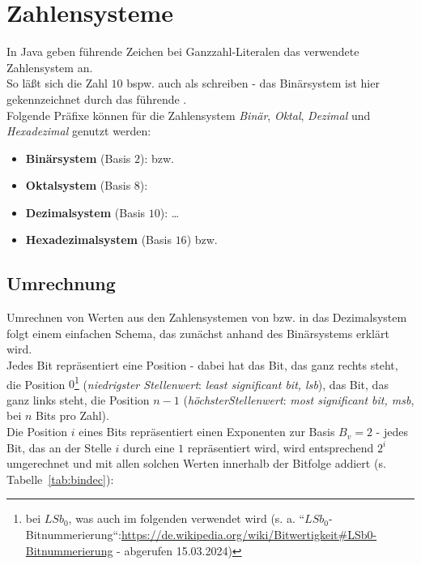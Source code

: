 
\section{Zahlensysteme}

In Java geben führende Zeichen bei Ganzzahl-Literalen das verwendete Zahlensystem an.\\

\noindent
So läßt sich die Zahl $10$ bspw. auch als  schreiben - das Binärsystem ist hier gekennzeichnet durch das führende .\\

\noindent
Folgende Präfixe können für die Zahlensystem \textit{Binär}, \textit{Oktal}, \textit{Dezimal} und \textit{Hexadezimal} genutzt werden:

\begin{itemize}
    \item \textbf{Binärsystem} (Basis $2$):  bzw. 
    \item \textbf{Oktalsystem} (Basis $8$): 
    \item \textbf{Dezimalsystem} (Basis $10$):  \ldots {}
    \item \textbf{Hexadezimalsystem} (Basis $16$)  bzw. 
\end{itemize}

\subsection{Umrechnung}

Umrechnen von Werten aus den Zahlensystemen von bzw. in das  Dezimalsystem folgt einem einfachen Schema, das zunächst anhand des Binärsystems erklärt wird.\\

Jedes Bit repräsentiert eine Position - dabei hat das Bit, das ganz rechts steht, die Position $0$\footnote{
bei $LSb_0$, was auch im folgenden verwendet wird (s. a. ``$LSb_0$-Bitnummerierung``:\url{https://de.wikipedia.org/wiki/Bitwertigkeit#LSb0-Bitnummerierung} - abgerufen 15.03.2024)
} (\textit{niedrigster Stellenwert}: \textit{least significant bit, lsb}), das Bit, das ganz links steht, die Position $n-1$ (\textit{höchsterStellenwert}: \textit{most significant bit, msb}, bei $n$ Bits pro Zahl).\\
Die Position $i$ eines Bits repräsentiert einen Exponenten zur Basis $B_v=2$ - jedes Bit, das an der Stelle $i$ durch eine $1$ repräsentiert wird, wird entsprechend $2^i$ umgerechnet und mit allen solchen Werten innerhalb der Bitfolge addiert (s. Tabelle~\ref{tab:bindec}):

